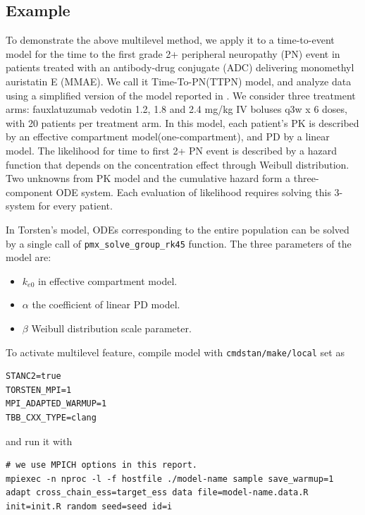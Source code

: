 \documentclass[11pt, reqno, oneside]{amsart}
\begin{document}
\subsection{Example}
\label{sec:org358ba2f}
To demonstrate the above multilevel method, we apply it to a
time-to-event model for the time to the first grade 2+ peripheral neuropathy (PN)
event in patients treated with an antibody-drug conjugate (ADC)
delivering monomethyl auristatin E (MMAE). We call it
Time-To-PN(TTPN) model, and analyze data using a
simplified version of the model reported in
\cite{lu_time--event_2017}. We consider three treatment arms:
fauxlatuzumab vedotin 1.2, 1.8 and 2.4 mg/kg IV boluses q3w x 6 doses,
with 20 patients per treatment arm. In this model,
each patient's PK is described by an effective compartment model(one-compartment),
and PD by a linear model. The likelihood for time to first 2+ PN event
is described by a hazard function that depends on the concentration
effect through Weibull distribution. Two unknowns from
PK model and the cumulative hazard form a three-component
ODE system. Each evaluation of likelihood requires solving this
3-system for every patient. 

In Torsten's model, ODEs corresponding to the entire
population can be solved by a single call of \texttt{pmx_solve_group_rk45} function. The three parameters of the
model are:
\begin{itemize}
\item \(k_{e0}\) in effective compartment model.
\item \(\alpha\) the coefficient of linear PD model.
\item \(\beta\) Weibull distribution scale parameter.
\end{itemize}

To activate multilevel feature, compile model with \texttt{cmdstan/make/local} set as
\begin{verbatim}
STANC2=true
TORSTEN_MPI=1
MPI_ADAPTED_WARMUP=1
TBB_CXX_TYPE=clang
\end{verbatim}
and run it with
\begin{verbatim}
# we use MPICH options in this report.
mpiexec -n nproc -l -f hostfile ./model-name sample save_warmup=1 adapt cross_chain_ess=target_ess data file=model-name.data.R init=init.R random seed=seed id=i
\end{verbatim}
\end{document}
